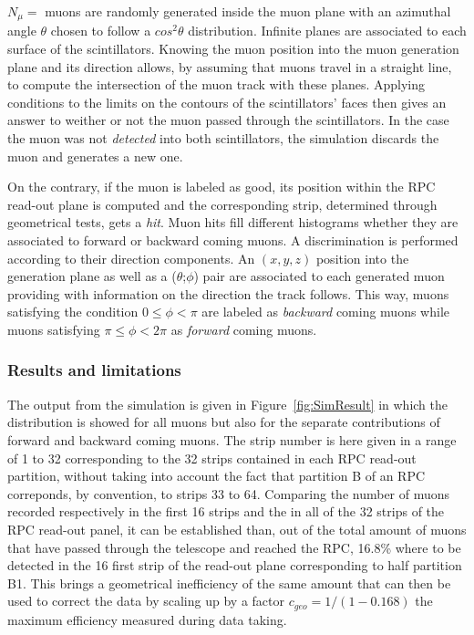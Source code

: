 	$N_{\mu}=$  muons are randomly generated inside the muon plane with an azimuthal angle $\theta$ chosen to follow a $cos^2\theta$ distribution. Infinite planes are associated to each surface of the scintillators. Knowing the muon position into the muon generation plane and its direction allows, by assuming that muons travel in a straight line, to compute the intersection of the muon track with these planes. Applying conditions to the limits on the contours of the scintillators' faces then gives an answer to weither or not the muon passed through the scintillators. In the case the muon was not \textit{detected} into both scintillators, the simulation discards the muon and generates a new one.
	
	On the contrary, if the muon is labeled as good, its position within the RPC read-out plane is computed and the corresponding strip, determined through geometrical tests, gets a \textit{hit}. Muon hits fill different histograms whether they are associated to forward or backward coming muons. A discrimination is performed according to their direction components. An $(x,y,z)$ position into the generation plane as well as a ($\theta$;$\phi$) pair are associated to each generated muon providing with information on the direction the track follows. This way, muons satisfying the condition $0\leq\phi<\pi$ are labeled as \textit{backward} coming muons while muons satisfying $\pi\leq\phi<2\pi$ as \textit{forward} coming muons.
		
		\subsubsection{Results and limitations}
		\label{chapt5:sssec:SimRes}
	
	The output from the simulation is given in Figure~\ref{fig:SimResult} in which the distribution is showed for all muons but also for the separate contributions of forward and backward coming muons. The strip number is here given in a range of 1 to 32 corresponding to the 32 strips contained in each RPC read-out partition, without taking into account the fact that partition B of an RPC correponds, by convention, to strips 33 to 64. Comparing the number of muons recorded respectively in the first 16 strips and the in all of the 32 strips of the RPC read-out panel, it can be established than, out of the total amount of muons that have passed through the telescope and reached the RPC, 16.8\% where to be detected in the 16 first strip of the read-out plane corresponding to half partition B1. This brings a geometrical inefficiency of the same amount that can then be used to correct the data by scaling up by a factor $c_{geo} = 1/(1-0.168)$ the maximum efficiency measured during data taking.

